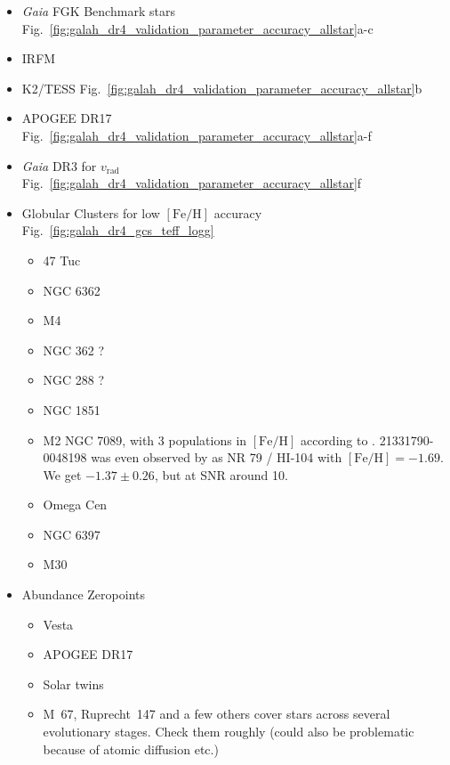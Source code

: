 \documentclass[
  journal=pasa,
  manuscript=research-paper, %
  year=2023,
  volume=37
]{cup-journal}
\newcommand{\feh}{$\mathrm{[Fe/H]}$\xspace}
\newcommand{\vrad}{$v_\mathrm{rad}$\xspace}
\newcommand{\Gaia}{\textit{Gaia}\xspace}
\begin{document}
\begin{itemize}
    \item \Gaia FGK Benchmark stars \citep{Jofre2018} Fig.~\ref{fig:galah_dr4_validation_parameter_accuracy_allstar}a-c
    \item IRFM \citep{Casagrande2020}
    \item K2/TESS \citet{Zinn2020} Fig.~\ref{fig:galah_dr4_validation_parameter_accuracy_allstar}b
    \item APOGEE DR17 Fig.~\ref{fig:galah_dr4_validation_parameter_accuracy_allstar}a-f
    \item \Gaia DR3 for \vrad Fig.~\ref{fig:galah_dr4_validation_parameter_accuracy_allstar}f
    \item Globular Clusters for low \feh accuracy Fig.~\ref{fig:galah_dr4_gcs_teff_logg}
    \begin{itemize}
        \item 47 Tuc \citet{Carretta2009, Carretta2009b}
        \item NGC 6362
        \item M4
        \item NGC 362 \citet{Monty2023}?
        \item NGC 288 \citet{Monty2023}?
        \item NGC 1851
        \item M2 NGC 7089, with 3 populations in \feh according to \citet{Yong2014}. 21331790-0048198 was even observed by \citet{Yong2014} as NR 79 / HI-104 with $\mathrm{[Fe/H]} = -1.69$. We get $-1.37 \pm 0.26$, but at SNR around 10.
        \item Omega Cen \cite{Johnson2010}
        \item NGC 6397 \citet{Carretta2009, Carretta2009b}
        \item M30 \citet{Carretta2009, Carretta2009b}
    \end{itemize}
    \item Abundance Zeropoints
    \begin{itemize}
        \item Vesta
        \item APOGEE DR17
        \item Solar twins
        \item  M~67, Ruprecht~147 and a few others cover stars across several evolutionary stages. Check them roughly (could also be problematic because of atomic diffusion etc.)
    \end{itemize}
\end{itemize}
\end{document}
